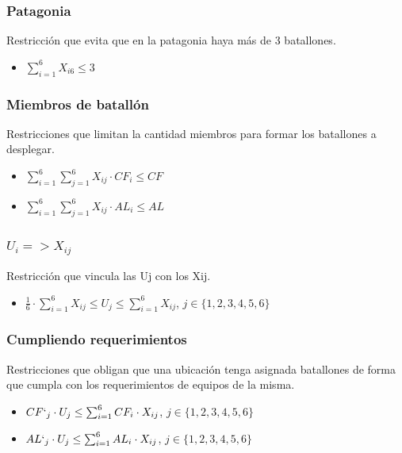 \documentclass[12pt]{article}
\begin{document}
\subsubsection{Patagonia}

Restricción que evita que en la patagonia haya más de 3 batallones.

\begin{itemize}
    \item $\sum_{i=1}^{6} X_{i6} \leq 3$
\end{itemize}

\subsubsection{Miembros de batallón}

Restricciones que limitan la cantidad miembros para formar los batallones a desplegar.

\begin{itemize}
    \item $ \sum_{i=1}^{6}\sum_{j=1}^{6} X_{ij} \cdot CF_{i} \leq CF$
    \item $ \sum_{i=1}^{6}\sum_{j=1}^{6} X_{ij} \cdot AL_{i} \leq AL$
\end{itemize}

\subsubsection{$U_{i} => X_{ij}$}

Restricción que vincula las Uj con los Xij.

\begin{itemize}
    \item $ \frac{1}{6} \cdot \sum_{i=1}^{6} X_{ij} \leq U_{j} \leq \sum_{i=1}^{6} X_{ij}$, $j \in \{1,2,3,4,5,6\}$
\end{itemize}

\subsubsection{Cumpliendo requerimientos}

Restricciones que obligan que una ubicación tenga asignada batallones de forma que cumpla con los requerimientos de equipos de la misma.

\begin{itemize}
    \item $ CF`_{j} \cdot U_{j} \leq \sum_{i=1}^{6} CF_{i} \cdot X_{ij}$, $j \in \{1,2,3,4,5,6\}$
    \item $ AL`_{j} \cdot U_{j} \leq \sum_{i=1}^{6} AL_{i} \cdot X_{ij}$, $j \in \{1,2,3,4,5,6\}$
\end{itemize}
\end{document}
